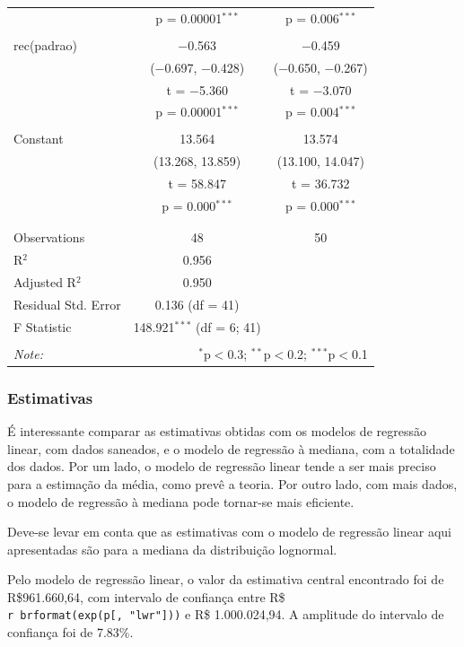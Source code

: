 \documentclass[a4paper, 12pt]{article}
\begin{document}
\begin{table}[!htbp]
\begin{tabular}{@{\extracolsep{5pt}}lcc}
  & p = 0.00001$^{***}$ & p = 0.006$^{***}$ \\ 
  & & \\ 
 rec(padrao) & $-$0.563 & $-$0.459 \\ 
  & ($-$0.697, $-$0.428) & ($-$0.650, $-$0.267) \\ 
  & t = $-$5.360 & t = $-$3.070 \\ 
  & p = 0.00001$^{***}$ & p = 0.004$^{***}$ \\ 
  & & \\ 
 Constant & 13.564 & 13.574 \\ 
  & (13.268, 13.859) & (13.100, 14.047) \\ 
  & t = 58.847 & t = 36.732 \\ 
  & p = 0.000$^{***}$ & p = 0.000$^{***}$ \\ 
  & & \\ 
\hline \\[-1.8ex] 
Observations & 48 & 50 \\ 
R$^{2}$ & 0.956 &  \\ 
Adjusted R$^{2}$ & 0.950 &  \\ 
Residual Std. Error & 0.136 (df = 41) &  \\ 
F Statistic & 148.921$^{***}$ (df = 6; 41) &  \\ 
\hline 
\hline \\[-1.8ex] 
\textit{Note:}  & \multicolumn{2}{r}{$^{*}$p$<$0.3; $^{**}$p$<$0.2; $^{***}$p$<$0.1} \\ 
\end{tabular} 
\end{table}

\hypertarget{estimativas}{%
\subsubsection{Estimativas}\label{estimativas}}

É interessante comparar as estimativas obtidas com os modelos de
regressão linear, com dados saneados, e o modelo de regressão à mediana,
com a totalidade dos dados. Por um lado, o modelo de regressão linear
tende a ser mais preciso para a estimação da média, como prevê a teoria.
Por outro lado, com mais dados, o modelo de regressão à mediana pode
tornar-se mais eficiente.

Deve-se levar em conta que as estimativas com o modelo de regressão
linear aqui apresentadas são para a mediana da distribuição lognormal.

Pelo modelo de regressão linear, o valor da estimativa central
encontrado foi de R\$961.660,64, com intervalo de confiança entre R\$
\texttt{r\ brformat(exp(p{[},\ "lwr"{]}))} e R\$ 1.000.024,94. A
amplitude do intervalo de confiança foi de 7.83\%.
\end{document}
